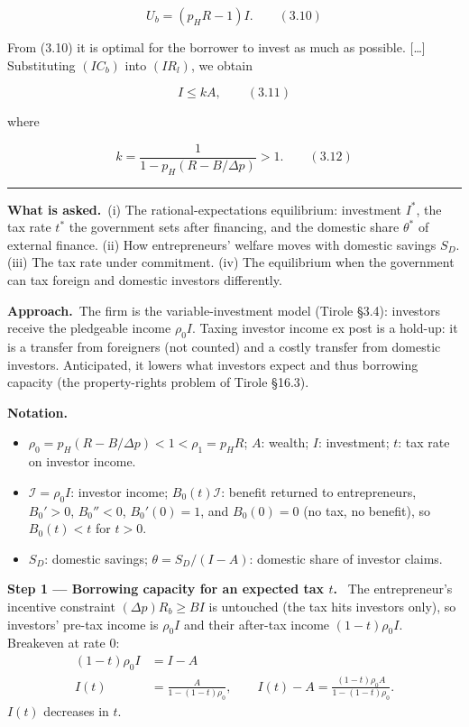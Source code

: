 \documentclass[11pt,a4paper]{article}
\newcommand{\notation}{\par\noindent\textbf{Notation.}}
\newcommand{\step}[2]{\par\medskip\noindent\textbf{Step #1 --- #2.}~}
\newcommand{\asked}{\par\medskip\noindent\textbf{What is asked.}~}
\newcommand{\approach}{\par\smallskip\noindent\textbf{Approach.}~}
\newcommand{\stmtend}{\par\endgroup\nopagebreak\noindent\rule{\linewidth}{0.4pt}\par\medskip}
\begin{document}
\[U_b = (p_H R - 1)I. \qquad (3.10)\]

From (3.10) it is optimal for the borrower to invest as much as possible. {[}\ldots{]} Substituting
\((IC_b)\) into \((IR_l)\), we obtain

\[I \leqslant kA, \qquad (3.11)\]

where

\[k = \frac{1}{1 - p_H(R - B/\Delta p)} > 1. \qquad (3.12)\]
\stmtend

\asked (i) The rational-expectations equilibrium: investment $I^*$, the tax rate $t^*$ the government sets after financing, and the domestic share $\theta^*$ of external finance. (ii) How entrepreneurs' welfare moves with domestic savings $S_D$. (iii) The tax rate under commitment. (iv) The equilibrium when the government can tax foreign and domestic investors differently.

\approach The firm is the variable-investment model (Tirole \S3.4): investors receive the pledgeable income $\rho_0I$. Taxing investor income ex post is a hold-up: it is a transfer from foreigners (not counted) and a costly transfer from domestic investors. Anticipated, it lowers what investors expect and thus borrowing capacity (the property-rights problem of Tirole \S16.3).

\notation
\begin{itemize}
  \item $\rho_0=p_H(R-B/\Delta p)<1<\rho_1=p_HR$; $A$: wealth; $I$: investment; $t$: tax rate on investor income.
  \item $\mathcal I=\rho_0I$: investor income; $B_0(t)\mathcal I$: benefit returned to entrepreneurs, $B_0'>0$, $B_0''<0$, $B_0'(0)=1$, and $B_0(0)=0$ (no tax, no benefit), so $B_0(t)<t$ for $t>0$.
  \item $S_D$: domestic savings; $\theta=S_D/(I-A)$: domestic share of investor claims.
\end{itemize}

\step{1}{Borrowing capacity for an expected tax $t$} The entrepreneur's incentive constraint $(\Delta p)R_b\geq BI$ is untouched (the tax hits investors only), so investors' pre-tax income is $\rho_0I$ and their after-tax income $(1-t)\rho_0I$. Breakeven at rate 0:
\begin{align}
  (1-t)\rho_0I &= I-A \nonumber\\
  I(t) &= \frac{A}{1-(1-t)\rho_0}, \qquad I(t)-A=\frac{(1-t)\rho_0A}{1-(1-t)\rho_0}. \label{r10e4-I}
\end{align}
$I(t)$ decreases in $t$.
\end{document}
